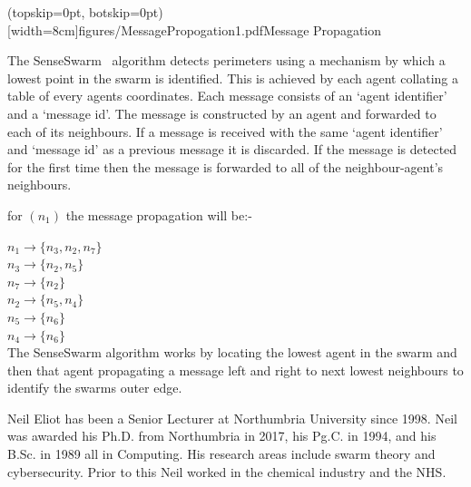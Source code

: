 \documentclass{ieeeaccess}
\begin{document}
\Figure[t!](topskip=0pt, botskip=0pt)[width=8cm]{figures/MessagePropogation1.pdf}{Message Propagation\label{methods:MessagePropogation1}}

The SenseSwarm~\cite{ZAPS:07, APZDAMC:09, AZDPS:11} algorithm detects perimeters using a mechanism by which a lowest point in the swarm is identified. This is achieved by each agent collating a table of every agents coordinates. Each message consists of an `agent identifier' and a `message id'. The message is constructed by an agent and forwarded to each of its neighbours. If a message is received with the same `agent identifier' and `message id' as a previous message it is discarded. If the message is detected for the first time then the message is forwarded to all of the neighbour-agent's neighbours.

for $(n_1)$ the message propagation will be:-

$n_1 \to \{n_3, n_2, n_7\}$ \\
$n_3 \to \{n_2, n_5\}$\\
$n_7 \to \{n_2\}$\\
$n_2 \to \{n_5, n_4\}$\\
$n_5 \to \{n_6\}$\\
$n_4 \to \{n_6\}$\\

The SenseSwarm algorithm works by locating the lowest agent in the swarm and then that agent propagating a message left and right to next lowest neighbours to identify the swarms outer edge. 




    \begin{IEEEbiography}{Neil Eliot}
	has been a Senior Lecturer at Northumbria University since 1998.  Neil was awarded his Ph.D. from Northumbria in 2017, his Pg.C. in 1994, and his B.Sc. in 1989 all in Computing. His research areas include swarm theory and cybersecurity. Prior to this Neil worked in the chemical industry and the NHS. 
	\end{IEEEbiography}
	
\end{document}
